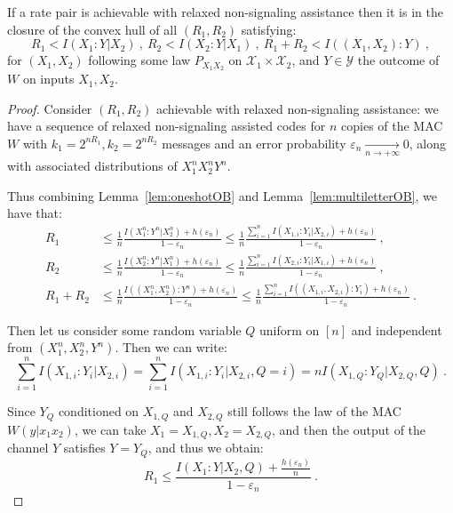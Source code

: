       \begin{proposition}
        \label{prop:OBNSrelaxed}
        If a rate pair is achievable with relaxed non-signaling assistance then it is in the closure of the convex hull of all $(R_1,R_2)$ satisfying:
        \[ R_1 < I(X_1:Y|X_2)\ ,\ R_2 < I(X_2:Y|X_1)\ ,\ R_1+R_2 < I((X_1,X_2):Y) \ ,\]
        for $(X_1,X_2)$ following some law $P_{X_1X_2}$ on $\mathcal{X}_1 \times \mathcal{X}_2$, and $Y \in \mathcal{Y}$ the outcome of $W$ on inputs $X_1,X_2$.
      \end{proposition}
      \begin{proof}
        Consider $(R_1,R_2)$ achievable with relaxed non-signaling assistance: we have a sequence of relaxed non-signaling assisted codes for $n$ copies of the MAC $W$ with $k_1 = 2^{nR_1}, k_2 = 2^{nR_2}$ messages and an error probability $\varepsilon_n \underset{n \rightarrow +\infty}{\rightarrow} 0$, along with associated distributions of $X_1^nX_2^nY^n$.

    Thus combining Lemma~\ref{lem:oneshotOB} and Lemma~\ref{lem:multiletterOB}, we have that:
    \begin{equation}
      \begin{aligned}
        R_1 &\leq \frac{1}{n}\frac{I(X_1^n:Y^n|X_2^n)+h(\varepsilon_n)}{1-\varepsilon_n} \leq \frac{1}{n} \frac{\sum_{i=1}^nI(X_{1,i}:Y_i|X_{2,i})+h(\varepsilon_n)}{1-\varepsilon_n}\ ,\\
        R_2 &\leq \frac{1}{n}\frac{I(X_2^n:Y^n|X_1^n)+h(\varepsilon_n)}{1-\varepsilon_n} \leq \frac{1}{n}\frac{\sum_{i=1}^nI(X_{2,i}:Y_i|X_{1,i})+h(\varepsilon_n)}{1-\varepsilon_n} \ ,\\
        R_1+R_2 &\leq \frac{1}{n}\frac{I((X_1^n,X_2^n):Y^n)+h(\varepsilon_n)}{1-\varepsilon_n} \leq \frac{1}{n} \frac{\sum_{i=1}^nI((X_{1,i},X_{2,i}):Y_i)+h(\varepsilon_n)}{1-\varepsilon_n} \ .
      \end{aligned}
    \end{equation}

    Then let us consider some random variable $Q$ uniform on $[n]$ and independent from $(X_1^n,X_2^n,Y^n)$. Then we can write:
    \[ \sum_{i=1}^nI(X_{1,i}:Y_i|X_{2,i}) = \sum_{i=1}^nI(X_{1,i}:Y_i|X_{2,i},Q=i) = nI(X_{1,Q}:Y_Q|X_{2,Q},Q ) \ . \]

    Since $Y_Q$ conditioned on $X_{1,Q}$ and $X_{2,Q}$ still follows the law of the MAC $W(y|x_1x_2)$, we can take $X_1=X_{1,Q},X_2=X_{2,Q}$, and then the output of the channel $Y$ satisfies $Y=Y_Q$, and thus we obtain:
    \[ R_1 \leq \frac{I(X_1:Y|X_2,Q)+\frac{h(\varepsilon_n)}{n}}{1-\varepsilon_n} \ .\]
    

\end{proof}
